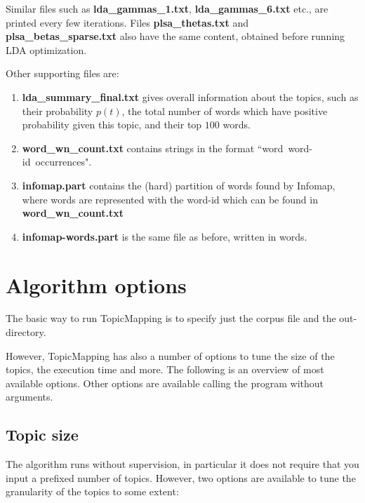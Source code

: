 \documentclass[11pt]{article}
\begin{document}
Similar files such as  \textbf{lda\_gammas\_1.txt},  \textbf{lda\_gammas\_6.txt} etc., are printed every few iterations. Files  \textbf{plsa\_thetas.txt} and  \textbf{plsa\_betas\_sparse.txt} also have the same content, obtained before running LDA optimization.



Other supporting files are:
\begin{enumerate}
\item \textbf{lda\_summary\_final.txt} gives overall information about the topics, such as their probability $p(t)$, the total number of words which have positive probability given this topic, and their top $100$ words.
\item \textbf{word\_wn\_count.txt} contains strings in the format ``word~word-id~occurrences".
\item \textbf{infomap.part} contains the (hard) partition of words found by Infomap, where words are represented with the word-id which can be found in  \textbf{word\_wn\_count.txt}
\item \textbf{infomap-words.part} is the same file as before, written in words.
\end{enumerate}


\section{Algorithm options}

The basic way to run TopicMapping is to specify just the corpus file and the out-directory.

However, TopicMapping has also a number of options to tune the size of the topics, the execution time and more.
The following is an overview of most available options. Other options are available calling the program without arguments.


\subsection{Topic size}

The algorithm runs without supervision, in particular it does not require that you input a prefixed number of topics. However,  two options are available to tune the granularity of the topics to some extent:
\end{document}
